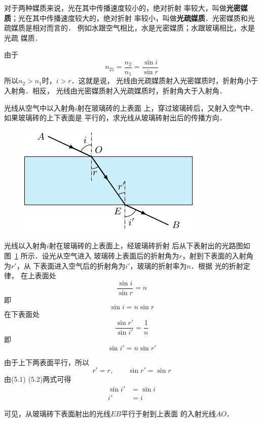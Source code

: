 对于两种媒质来说，光在其中传播速度较小的，绝对折射
率较大，叫做\textbf{光密媒质}；光在其中传播速度较大的，绝对折射
率较小，叫做\textbf{光疏媒质}．光密媒质和光疏媒质是相对而言的．
例如水跟空气相比，水是光密媒质；水跟玻璃相比，水是光疏
媒质．

由于
\[n_{21}=\frac{n_2}{n_1}=\frac{\sin i}{\sin r} \]
所以$n_2>n_1$时，$i>r$．这就是说，
光线由光疏媒质射入光密媒质时，折射角小于入射角．相反，
光线由光密媒质射入光疏媒质时，折射角大于入射角．

\begin{example}
    光线从空气中以入射角$i$射在玻璃砖的上表面
    上，穿过玻璃砖后，又射入空气中．如果玻璃砖的上下表面是
    平行的，求光线从玻璃砖射出后的传播方向．
\end{example}

\begin{figure}[htbp]
    \centering
    \includegraphics{fig/C/5-21.pdf}
    \caption{}\label{fig_C_5-21}
\end{figure}


\begin{solution}
    光线以入射角$i$射在玻璃砖的上表面上，经玻璃砖折射
后从下表射出的光路图如图~\ref{fig_C_5-21} 所示．设光从空气进入
玻璃砖上表面后的折射角为$r$，射到下表面的入射角为$r'$，从
下表面进入空气后的折射角为$i'$，玻璃的折射率为$n$．根据
光的折射定律，
在上表面处
\[\frac{\sin i}{\sin r}=n \]
即
\begin{equation}
    \sin i=n\sin r 
\end{equation}
在下表面处
\[\frac{\sin r'}{\sin i'}=\frac{1}{n} \]
即
\begin{equation}
    \sin i' =n \sin r'
\end{equation}

由于上下两表面平行，所以
\[r'=r,\qquad \sin r'=\sin r \]
由(5.1)
(5.2)两式可得
\[\begin{split}
    \sin i'&=\sin i\\
i'&=i    
\end{split}\]

可见，从玻璃砖下表面射出的光线$EB$平行于射到上表面
的入射光线$AO$．
\end{solution}


